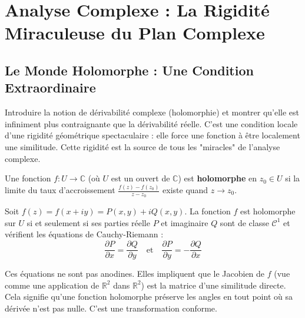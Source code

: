 \chapter{Analyse Complexe : La Rigidité Miraculeuse du Plan Complexe}

\section{Le Monde Holomorphe : Une Condition Extraordinaire}

\begin{objectif}
    Introduire la notion de dérivabilité complexe (holomorphie) et montrer qu'elle est infiniment plus contraignante que la dérivabilité réelle. C'est une condition locale d'une rigidité géométrique spectaculaire : elle force une fonction à être localement une similitude. Cette rigidité est la source de tous les "miracles" de l'analyse complexe.
\end{objectif}

\begin{definition}
    Une fonction $f: U \to \mathbb{C}$ (où $U$ est un ouvert de $\mathbb{C}$) est \textbf{holomorphe} en $z_0 \in U$ si la limite du taux d'accroissement $\frac{f(z)-f(z_0)}{z-z_0}$ existe quand $z \to z_0$.
\end{definition}

\begin{theorem}
    Soit $f(z) = f(x+iy) = P(x,y) + iQ(x,y)$. La fonction $f$ est holomorphe sur $U$ si et seulement si ses parties réelle $P$ et imaginaire $Q$ sont de classe $\mathcal{C}^1$ et vérifient les équations de Cauchy-Riemann :
    $$ \frac{\partial P}{\partial x} = \frac{\partial Q}{\partial y} \quad \text{et} \quad \frac{\partial P}{\partial y} = -\frac{\partial Q}{\partial x} $$
\end{theorem}

\begin{remark}
    Ces équations ne sont pas anodines. Elles impliquent que le Jacobien de $f$ (vue comme une application de $\mathbb{R}^2$ dans $\mathbb{R}^2$) est la matrice d'une similitude directe. Cela signifie qu'une fonction holomorphe préserve les angles en tout point où sa dérivée n'est pas nulle. C'est une transformation conforme.
\end{remark}

